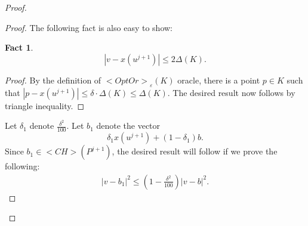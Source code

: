 \documentclass[11pt,letterpaper]{article}
\newcounter{note}[section]
\def\mathsf#1{<#1>}%
\newtheorem{fact}[theorem]{Fact}
\theoremstyle{definition}
\theoremstyle{remark}
\newcommand{\CH}{{\mathsf {CH}}}
\newcommand{\opto}{{\mathsf{OptOr}}}
\begin{document}
\begin{proof}
\begin{proof}
The following fact is also easy to show:
\begin{fact}
    \label{fact:easy}
$$ |v-x(u^{j+1})| \leq 2 \Delta(K).$$
\end{fact}
\begin{proof}
    By the definition of $\opto_\varepsilon(K)$ oracle, there is a point $p \in K$ such that $|p-x(u^{j+1})| \leq \delta \cdot \Delta(K) \leq \Delta(K)$. The desired result now follows by triangle inequality. 
\end{proof}

 Let  $\delta_1$ denote $\frac{\delta^2}{100}$. Let $b_1$ denote the vector
 $$ \delta_1 x(u^{j+1}) + (1-\delta_1)b. $$
 Since $b_1 \in \CH(P^{j+1})$, the desired result will follow if we prove the following:
 \begin{align}
     \label{eq:tech4}
     |v-b_1|^2 \leq \left(1- \frac{\delta^2}{100} \right) |v-b|^2. 
 \end{align}


\end{proof}
\end{proof}
\end{document}
